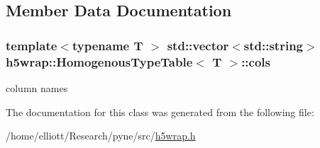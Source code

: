 \subsection{Member Data Documentation}
\hypertarget{classh5wrap_1_1_homogenous_type_table_a8b60fa54475f44bea26caab0137d8507}{
\subsubsection[{cols}]{\setlength{\rightskip}{0pt plus 5cm}template$<$typename T $>$ std\-::vector$<$std\-::string$>$ {\bf h5wrap\-::\-Homogenous\-Type\-Table}$<$ T $>$\-::cols}}\label{classh5wrap_1_1_homogenous_type_table_a8b60fa54475f44bea26caab0137d8507}
column names 

The documentation for this class was generated from the following file\-:\begin{DoxyCompactItemize}
\item 
/home/elliott/\-Research/pyne/src/\hyperlink{h5wrap_8h}{h5wrap.\-h}\end{DoxyCompactItemize}
